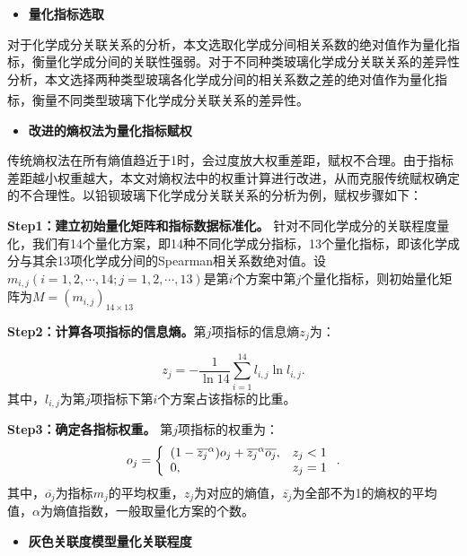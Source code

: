 \documentclass[withoutpreface,bwprint]{cumcmthesis} %
\begin{document}
\begin{itemize}
  \item \textbf{量化指标选取}
\end{itemize}

对于化学成分关联关系的分析，本文选取化学成分间相关系数的绝对值作为量化指标，衡量化学成分间的关联性强弱。对于不同种类玻璃化学成分关联关系的差异性分析，本文选择两种类型玻璃各化学成分间的相关系数之差的绝对值作为量化指标，衡量不同类型玻璃下化学成分关联关系的差异性\textsuperscript{\cite{ref10}}。

\begin{itemize}
  \item \textbf{改进的熵权法为量化指标赋权}
\end{itemize}

传统熵权法在所有熵值趋近于1时，会过度放大权重差距，赋权不合理。由于指标差距越小权重越大，本文对熵权法中的权重计算进行改进，从而克服传统赋权确定的不合理性。以铅钡玻璃下化学成分关联关系的分析为例，赋权步骤如下：

\textbf{Step1：建立初始量化矩阵和指标数据标准化。} 针对不同化学成分的关联程度量化，我们有14个量化方案，即14种不同化学成分指标，13个量化指标，即该化学成分与其余13项化学成分间的Spearman相关系数绝对值。设$m_{i,j}(i=1,2,\cdots,14;j=1,2,\cdots,13)$是第$i$个方案中第$j$个量化指标，则初始量化矩阵为$M=(m_{i,j})_{14 \times 13}$

\textbf{Step2：计算各项指标的信息熵。}第$j$项指标的信息熵$z _ { j }$为：

\begin{equation}
  z _ { j } = - \frac { 1 } { \ln 14 } \sum _ { i = 1 } ^ { 14 } l _ { i,j } \ln l _ { i,j }.
\end{equation}
其中，$l_{i,j}$为第$j$项指标下第$i$个方案占该指标的比重。

\textbf{Step3：确定各指标权重。} 第$j$项指标的权重为：
\begin{equation}
  o _ { j } = \left\{ \begin{array} { l r } { ( 1 - \overline { z_j } ^ { \alpha } ) o _ {  j } + \overline { z_j } ^ { \alpha }\overline{ o _ {  j } },}&{ z _ { j } < 1 } \\ { 0 , } & { z _ { j } = 1 } \end{array} \right. .
\end{equation}
其中，$\overline{o_{j}}$为指标$m_j$的平均权重，$z_j$为对应的熵值，$\overline { z_j }$为全部不为1的熵权的平均值，$\alpha$为熵值指数，一般取量化方案的个数。

\begin{itemize}
  \item \textbf{灰色关联度模型量化关联程度}
\end{itemize}
\end{document}
